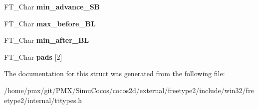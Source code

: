 \begin{DoxyCompactItemize}
F\+T\+\_\+\+Char {\bfseries min\+\_\+advance\+\_\+\+SB}
\item 
\mbox{\label{structTT__SBit__LineMetricsRec___a63599b9adfc64d1927b6a8b46d9ce08d}} 
F\+T\+\_\+\+Char {\bfseries max\+\_\+before\+\_\+\+BL}
\item 
\mbox{\label{structTT__SBit__LineMetricsRec___a553dfe17d98fd138430545f4f77195c5}} 
F\+T\+\_\+\+Char {\bfseries min\+\_\+after\+\_\+\+BL}
\item 
\mbox{\label{structTT__SBit__LineMetricsRec___a4e1d66105995de59dd0c687c333802ae}} 
F\+T\+\_\+\+Char {\bfseries pads} \mbox{[}2\mbox{]}
\end{DoxyCompactItemize}


The documentation for this struct was generated from the following file\+:\begin{DoxyCompactItemize}
\item 
/home/pmx/git/\+P\+M\+X/\+Simu\+Cocos/cocos2d/external/freetype2/include/win32/freetype2/internal/tttypes.\+h\end{DoxyCompactItemize}
